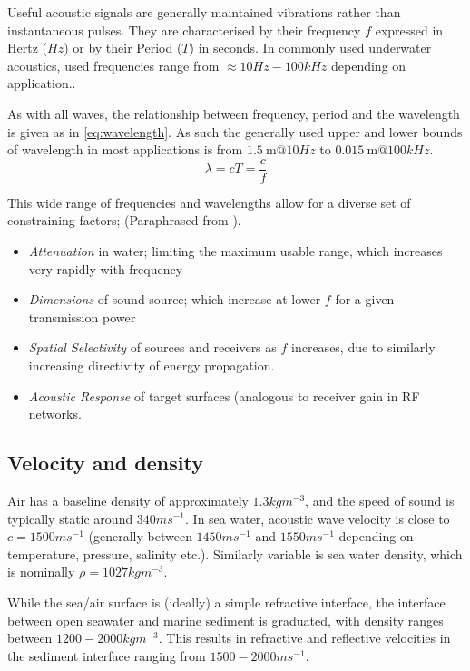 Useful acoustic signals are generally maintained vibrations rather than instantaneous pulses.
They are characterised by their frequency $f$ expressed in Hertz ($Hz$) or by their Period ($T$) in seconds.
In commonly used underwater acoustics, used frequencies range from $\approx 10Hz-100kHz$ depending on application.\cite{Stojanovic2007}.

As with all waves, the relationship between frequency, period and the wavelength is given as in \eqref{eq:wavelength}. 
As such the generally used upper and lower bounds of wavelength in most applications is from $\SI{1.5}{\meter} @ 10Hz$ to $\SI{0.015}{\meter} @ 100kHz$.
%
\begin{equation}
  \lambda = cT = \frac{c}{f}
  \label{eq:wavelength}
\end{equation}
%

This wide range of frequencies and wavelengths allow for a diverse set of constraining factors; (Paraphrased from \citet{lurton2010}).

\begin{itemize}
  \item \emph{Attenuation} in water; limiting the maximum usable range, which increases very rapidly with frequency
  \item \emph{Dimensions} of sound source; which increase at lower $f$ for a given transmission power
  \item \emph{Spatial Selectivity} of sources and receivers as $f$ increases, due to similarly increasing directivity of energy propagation.
  \item \emph{Acoustic Response} of target surfaces (analogous to receiver gain in RF networks.
\end{itemize}

\subsection{Velocity and density}

Air has a baseline density of approximately $1.3 kg m^{-3}$, and the speed of sound is typically static around $340 ms^{-1}$.
In sea water, acoustic wave velocity is close to $c=1500ms^{-1}$ (generally between $1450ms^{-1}$ and $1550ms^{-1}$ depending on temperature, pressure, salinity etc.).
Similarly variable is sea water density, which is nominally $\rho = 1027kg m^{-3}$\cite{Wang2010}.

While the sea/air surface is (ideally) a simple refractive interface, the interface between open seawater and marine sediment is graduated, with density ranges between $1200 - 2000 kg m^{-3}$. 
This results in refractive and reflective velocities in the sediment interface ranging from $1500-2000 ms^{-1}$\cite{lurton2010}.

